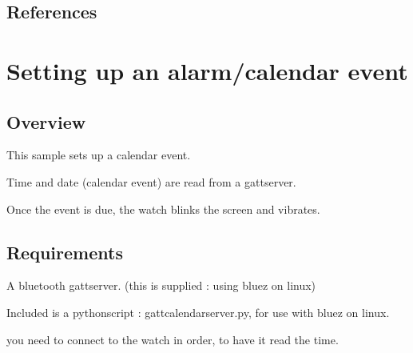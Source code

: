 \documentclass[letterpaper,10pt,english]{sphinxmanual}
\begin{document}
\subsection{References}
\label{\detokenize{samples/oswatch-btREADME:references}}

\section{Setting up an alarm/calendar event}
\label{\detokenize{samples/oswatch-calendarREADME:setting-up-an-alarm-calendar-event}}\label{\detokenize{samples/oswatch-calendarREADME:oswatch}}\label{\detokenize{samples/oswatch-calendarREADME::doc}}

\subsection{Overview}
\label{\detokenize{samples/oswatch-calendarREADME:overview}}
This sample sets up a calendar event.

Time and date (calendar event) are read from a gatt\sphinxhyphen{}server.

Once the event is due, the watch blinks the screen and vibrates.


\subsection{Requirements}
\label{\detokenize{samples/oswatch-calendarREADME:requirements}}
A bluetooth gatt\sphinxhyphen{}server. (this is supplied : using bluez on linux)

Included is a python\sphinxhyphen{}script : gatt\sphinxhyphen{}calendar\sphinxhyphen{}server.py, for use with bluez on linux.

\begin{sphinxVerbatim}[commandchars=\\\{\}]
 
\end{sphinxVerbatim}

you need to connect to the watch in order, to have it read the time.

\begin{sphinxVerbatim}[commandchars=\\\{\}]
      
      
\end{sphinxVerbatim}
\end{document}
